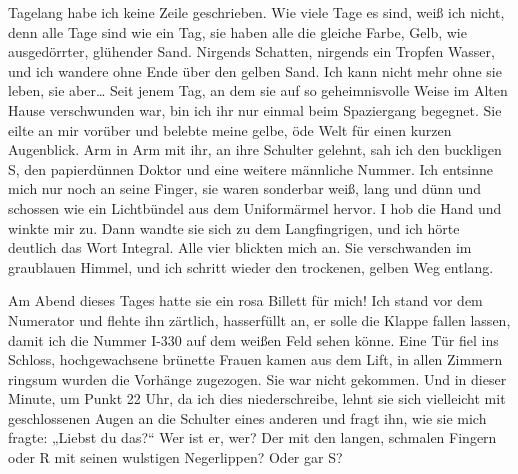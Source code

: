 Tagelang habe ich keine Zeile geschrieben. Wie viele Tage es sind,
weiß ich nicht, denn alle Tage sind wie ein Tag, sie haben alle die
gleiche Farbe, Gelb, wie ausgedörrter, glühender Sand. Nirgends
Schatten, nirgends ein Tropfen Wasser, und ich wandere ohne Ende
über den gelben Sand. Ich kann nicht mehr ohne sie leben, sie
aber\ldots{} Seit jenem Tag, an dem sie auf so geheimnisvolle Weise im
Alten Hause verschwunden war, bin ich ihr nur einmal beim
Spaziergang begegnet. Sie eilte an mir vorüber und belebte meine
gelbe, öde Welt für einen kurzen Augenblick. Arm in Arm mit ihr, an
ihre Schulter gelehnt, sah ich den buckligen S, den papierdünnen
Doktor und eine weitere männliche Nummer. Ich entsinne mich nur
noch an seine Finger, sie waren sonderbar weiß, lang und dünn und
schossen wie ein Lichtbündel aus dem Uniformärmel hervor. I hob
die Hand und winkte mir zu. Dann wandte sie sich zu dem
Langfingrigen, und ich hörte deutlich das Wort Integral. Alle vier
blickten mich an. Sie verschwanden im graublauen Himmel, und ich
schritt wieder den trockenen, gelben Weg entlang.

Am Abend dieses Tages hatte sie ein rosa Billett für mich! Ich
stand vor dem Numerator und flehte ihn zärtlich, hasserfüllt an, er
solle die Klappe fallen lassen, damit ich die Nummer I-330 auf dem
weißen Feld sehen könne. Eine Tür fiel ins Schloss, hochgewachsene
brünette Frauen kamen aus dem Lift, in allen Zimmern ringsum wurden
die Vorhänge zugezogen. Sie war nicht gekommen. Und in dieser
Minute, um Punkt 22 Uhr, da ich dies
niederschreibe, lehnt sie sich vielleicht mit geschlossenen Augen
an die Schulter eines anderen und fragt ihn, wie sie mich fragte:
„Liebst du das?“ Wer ist er, wer? Der mit den langen, schmalen
Fingern oder R mit seinen wulstigen Negerlippen? Oder gar S?


